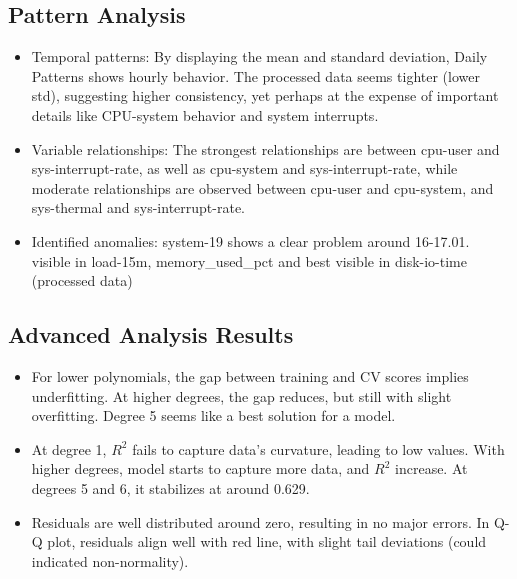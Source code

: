 \documentclass[11pt]{article}
\begin{document}
	\subsection{Pattern Analysis}
	\begin{itemize}
		\item Temporal patterns: By displaying the mean and standard deviation, Daily Patterns shows hourly behavior. The processed data seems tighter (lower std), suggesting higher consistency, yet perhaps at the expense of important details like CPU-system behavior and system interrupts.
		
		\item Variable relationships: The strongest relationships are between cpu-user and sys-interrupt-rate, as well as cpu-system and sys-interrupt-rate, while moderate relationships are observed between cpu-user and cpu-system, and sys-thermal and sys-interrupt-rate.
		
		\item Identified anomalies: system-19 shows a clear problem around 16-17.01. visible in load-15m, memory\_used\_pct and best visible in disk-io-time (processed data)
	\end{itemize}
	
	\subsection{Advanced Analysis Results}
	\begin{itemize}
		\item For lower polynomials, the gap between training and CV scores implies underfitting. At higher degrees, the gap reduces, but still with slight overfitting. Degree 5 seems like a best solution for a model.
		\item At degree 1, $R^2$ fails to capture data's curvature, leading to low values. With higher degrees, model starts to capture more data, and $R^2$ increase. At degrees 5 and 6, it stabilizes at around 0.629. 
		
		\item Residuals are well distributed around zero, resulting in no major errors. In Q-Q plot, residuals align well with red line, with slight tail deviations (could indicated non-normality).
	\end{itemize}
	
\end{document}
